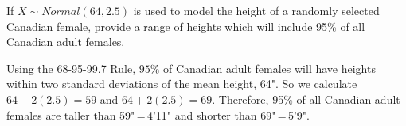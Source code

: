 \begin{examp}If $X \sim Normal(64,2.5)$ is used to model the height of a randomly selected Canadian female, provide a range of heights which will include 95\% of all Canadian adult females.
\par
\noindent Using the 68-95-99.7 Rule, $95\%$ of Canadian adult females will have heights within two standard deviations of the mean height, 64". So we calculate $64 - 2(2.5) = 59$ and $64 + 2(2.5) =69$. Therefore, 95\% of all Canadian adult females are taller than 59"\,=\,4'11" and shorter than 69"\,=\,5'9".
\end{examp}
